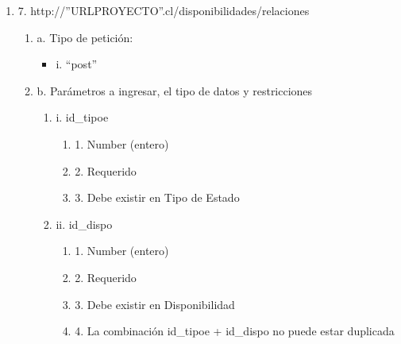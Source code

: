 \begin{enumerate}
    \item 7. http://”URLPROYECTO”.cl/disponibilidades/relaciones
    \begin{enumerate}
        \item a. Tipo de petición:
            \begin{itemize}
               \item i. “post”
            \end{itemize}
        \item b. Parámetros a ingresar, el tipo de datos y restricciones
            \begin{enumerate}
                \item i. id\_tipoe
                    \begin{enumerate}
                        \item 1. Number (entero)
                        \item 2. Requerido
                        \item 3. Debe existir en Tipo de Estado
                    \end{enumerate}
                \item ii. id\_dispo
                    \begin{enumerate}
                        \item 1. Number (entero)
                        \item 2. Requerido
                        \item 3. Debe existir en Disponibilidad
                        \item 4. La combinación id\_tipoe + id\_dispo no puede estar duplicada
                    \end{enumerate}
            \end{enumerate}
    \end{enumerate}


\end{enumerate}
